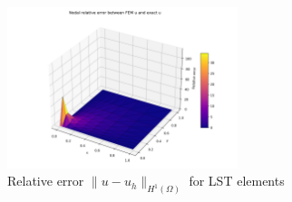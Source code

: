 \begin{figure}[H]
\centering
\includegraphics[width=0.6\textwidth]{GRAFICOS/LST/LST_relative_error_surface_plot.png}
\caption{Relative error \(\|u - u_h\|_{H^1(\Omega)}\) for LST elements}
\label{fig:lst_error_vs_h}
\end{figure}